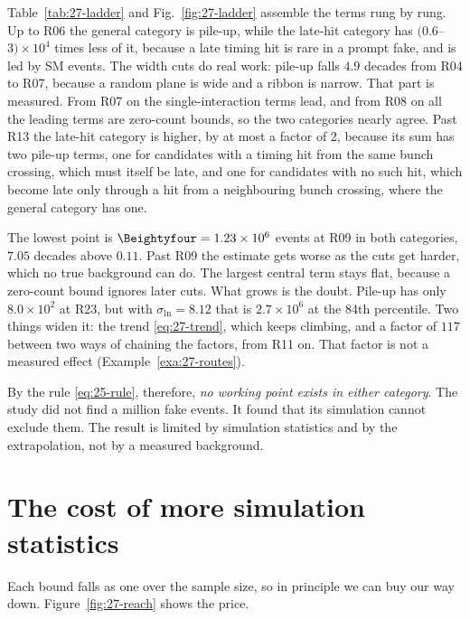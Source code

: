 Table~\ref{tab:27-ladder} and Fig.~\ref{fig:27-ladder} assemble the terms rung by rung. Up to R06 the general category is pile-up, while the late-hit category has $(0.6$--$3)\times10^4$ times less of it, because a late timing hit is rare in a prompt fake, and is led by SM events. The width cuts do real work:
pile-up falls $4.9$ decades from R04 to R07, because a random plane is wide and a ribbon is narrow. That part is measured. From R07 on the single-interaction terms lead, and from R08 on all the leading terms are zero-count bounds, so the two categories nearly agree. Past R13 the late-hit category is higher, by at most a factor of 2, because its sum has two pile-up terms, one for candidates with a timing hit from the same bunch crossing, which must itself be late, and one for candidates with no such hit, which become late only through a hit from a neighbouring bunch crossing, where the general category has one.

The lowest point is $\Beightyfour=1.23\times10^6$ events at R09 in both categories, $7.05$ decades above $0.11$. Past R09 the estimate gets worse as the cuts get harder, which no true background can do. The largest central term stays flat, because a zero-count bound ignores later cuts. What grows is the doubt. Pile-up has only $8.0\times10^2$ at R23, but with $\sigma_{\ln}=8.12$ that is $2.7\times10^6$ at the 84th percentile. Two things widen it: the trend \eqref{eq:27-trend}, which keeps climbing, and a factor of $117$ between two ways of chaining the factors, from R11 on. That factor is not a measured effect (Example~\ref{exa:27-routes}).

By the rule \eqref{eq:25-rule}, therefore, \emph{no working point exists in either category}. The study did not find a million fake events. It found that its simulation cannot exclude them. The result is limited by simulation statistics and by the extrapolation, not by a measured background.

\section{The cost of more simulation statistics}\label{sec:27-statistics}

Each bound falls as one over the sample size, so in principle we can buy our way down. Figure~\ref{fig:27-reach} shows the price.

